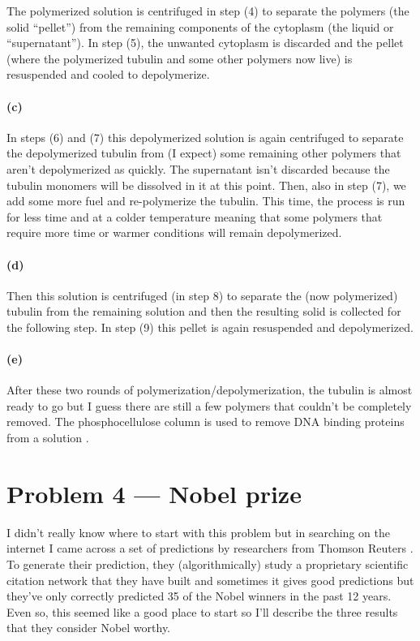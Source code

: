\documentclass[12pt]{article}
\begin{document}
The polymerized solution is centrifuged in step (4) to separate the polymers
(the solid ``pellet'') from the remaining components of the cytoplasm (the
liquid or ``supernatant'').
In step (5), the unwanted cytoplasm is discarded and the pellet (where the
polymerized tubulin and some other polymers now live) is resuspended and
cooled to depolymerize.

\paragraph{(c)}

In steps (6) and (7) this depolymerized solution is again centrifuged to
separate the depolymerized tubulin from (I expect) some remaining other
polymers that aren't depolymerized as quickly.
The supernatant isn't discarded because the tubulin monomers will be dissolved
in it at this point.
Then, also in step (7), we add some more fuel and re-polymerize the tubulin.
This time, the process is run for less time and at a colder temperature
meaning that some polymers that require more time or warmer conditions will
remain depolymerized.

\paragraph{(d)}

Then this solution is centrifuged (in step 8) to separate the (now
polymerized) tubulin from the remaining solution and then the resulting solid
is collected for the following step.
In step (9) this pellet is again resuspended and depolymerized.

\paragraph{(e)}

After these two rounds of polymerization/depolymerization, the tubulin is
almost ready to go but I guess there are still a few polymers that couldn't be
completely removed.
The phosphocellulose column is used to remove DNA binding proteins from a
solution \cite{pc}.


\section{Problem 4 --- Nobel prize}

I didn't really know where to start with this problem but in searching on the
internet I came across a set of predictions by researchers from Thomson
Reuters \cite{predict}.
To generate their prediction, they (algorithmically) study a proprietary
scientific citation network that they have built and sometimes it gives good
predictions but they've only correctly predicted 35 of the Nobel winners in
the past 12 years.
Even so, this seemed like a good place to start so I'll describe the three
results that they consider Nobel worthy.
\end{document}
